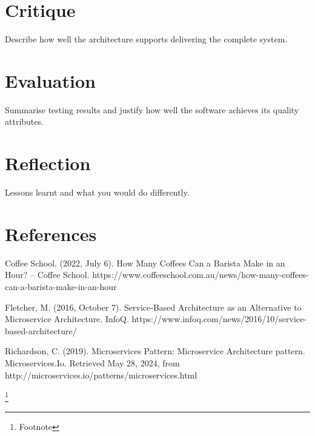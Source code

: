 \documentclass{article}
\begin{document}
\section{Critique}
Describe how well the architecture supports delivering the complete system.
\section{Evaluation}
Summarise testing results and justify how well the software achieves its quality attributes.
\section{Reflection}
Lessons learnt and what you would do differently.

\section{References}
\par \sloppy Coffee School. (2022, July 6). How Many Coffees Can a Barista Make in an Hour? – Coffee School. https://www.coffeeschool.com.au/news/how-many-coffees-can-a-barista-make-in-an-hour
\par Fletcher, M. (2016, October 7). Service-Based Architecture as an Alternative to Microservice Architecture. InfoQ. https://www.infoq.com/news/2016/10/service-based-architecture/
\par Richardson, C. (2019). Microservices Pattern: Microservice Architecture pattern. Microservices.Io. Retrieved May 28, 2024, from http://microservices.io/patterns/microservices.html

\footnote{Footnote}
\end{document}
